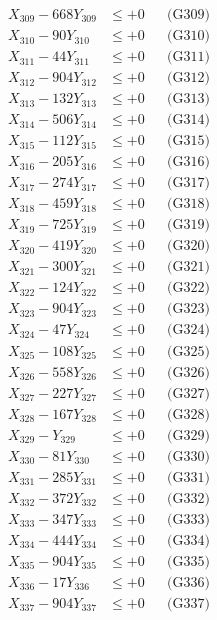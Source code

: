 \documentclass[a4paper,10pt]{article}
\begin{document}
{\begin{align}
X_{309} - 668Y_{309} &\leq +0 && \text{(G309)} \\
X_{310} - 90Y_{310} &\leq +0 && \text{(G310)} \\
\allowbreak
X_{311} - 44Y_{311} &\leq +0 && \text{(G311)} \\
X_{312} - 904Y_{312} &\leq +0 && \text{(G312)} \\
X_{313} - 132Y_{313} &\leq +0 && \text{(G313)} \\
X_{314} - 506Y_{314} &\leq +0 && \text{(G314)} \\
X_{315} - 112Y_{315} &\leq +0 && \text{(G315)} \\
X_{316} - 205Y_{316} &\leq +0 && \text{(G316)} \\
X_{317} - 274Y_{317} &\leq +0 && \text{(G317)} \\
X_{318} - 459Y_{318} &\leq +0 && \text{(G318)} \\
X_{319} - 725Y_{319} &\leq +0 && \text{(G319)} \\
X_{320} - 419Y_{320} &\leq +0 && \text{(G320)} \\
\allowbreak
X_{321} - 300Y_{321} &\leq +0 && \text{(G321)} \\
X_{322} - 124Y_{322} &\leq +0 && \text{(G322)} \\
X_{323} - 904Y_{323} &\leq +0 && \text{(G323)} \\
X_{324} - 47Y_{324} &\leq +0 && \text{(G324)} \\
X_{325} - 108Y_{325} &\leq +0 && \text{(G325)} \\
X_{326} - 558Y_{326} &\leq +0 && \text{(G326)} \\
X_{327} - 227Y_{327} &\leq +0 && \text{(G327)} \\
X_{328} - 167Y_{328} &\leq +0 && \text{(G328)} \\
X_{329} - Y_{329} &\leq +0 && \text{(G329)} \\
X_{330} - 81Y_{330} &\leq +0 && \text{(G330)} \\
\allowbreak
X_{331} - 285Y_{331} &\leq +0 && \text{(G331)} \\
X_{332} - 372Y_{332} &\leq +0 && \text{(G332)} \\
X_{333} - 347Y_{333} &\leq +0 && \text{(G333)} \\
X_{334} - 444Y_{334} &\leq +0 && \text{(G334)} \\
X_{335} - 904Y_{335} &\leq +0 && \text{(G335)} \\
X_{336} - 17Y_{336} &\leq +0 && \text{(G336)} \\
X_{337} - 904Y_{337} &\leq +0 && \text{(G337)} \\

\end{align}}
\end{document}
